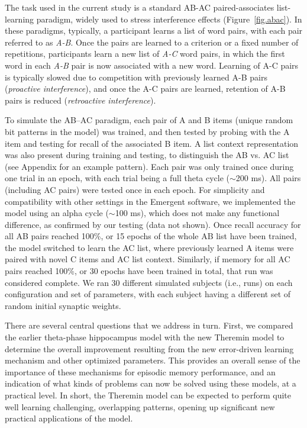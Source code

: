 \documentclass[11pt,twoside]{article}
\newif\myifpdf
\begin{document}
The task used in the current study is a standard AB-AC paired-associates list-learning paradigm, widely used to stress interference effects \citep{BarnesUnderwood59,McCloskeyCohen89} (Figure~\ref{fig.abac}). In these paradigms, typically, a participant learns a list of word pairs, with each pair referred to as \emph{A-B}. Once the pairs are learned to a criterion or a fixed number of repetitions, participants learn a new list of \emph{A-C} word pairs, in which the first word in each \emph{A-B} pair is now associated with a new word. Learning of A-C pairs is typically slowed due to competition with previously learned A-B pairs (\emph{proactive interference}), and once the A-C pairs are learned, retention of A-B pairs is reduced (\emph{retroactive interference}).

To simulate the AB--AC paradigm, each pair of A and B items (unique random bit patterns in the model) was trained, and then tested by probing with the A item and testing for recall of the associated B item.  A list context representation was also present during training and testing, to distinguish the AB vs. AC list (see Appendix for an example pattern).  Each pair was only trained once during one trial in an epoch, with each trial being a full theta cycle ($\sim$200 ms).  All pairs (including AC pairs) were tested once in each epoch.  For simplicity and compatibility with other settings in the Emergent software, we implemented the model using an alpha cycle ($\sim$100 ms), which does not make any functional difference, as confirmed by our testing (data not shown).  Once recall accuracy for all AB pairs reached 100\%, or 15 epochs of the whole AB list have been trained, the model switched to learn the AC list, where previously learned A items were paired with novel C items and AC list context. Similarly, if memory for all AC pairs reached 100\%, or 30 epochs have been trained in total, that run was considered complete.  We ran 30 different simulated subjects (i.e., runs) on each configuration and set of parameters, with each subject having a different set of random initial synaptic weights. 

There are several central questions that we address in turn.  First, we compared the earlier theta-phase hippocampus model with the new Theremin model to determine the overall improvement resulting from the new error-driven learning mechanism and other optimized parameters.  This provides an overall sense of the importance of these mechanisms for episodic memory performance, and an indication of what kinds of problems can now be solved using these models, at a practical level.  In short, the Theremin model can be expected to perform quite well learning challenging, overlapping patterns, opening up significant new practical applications of the model.
\end{document}
